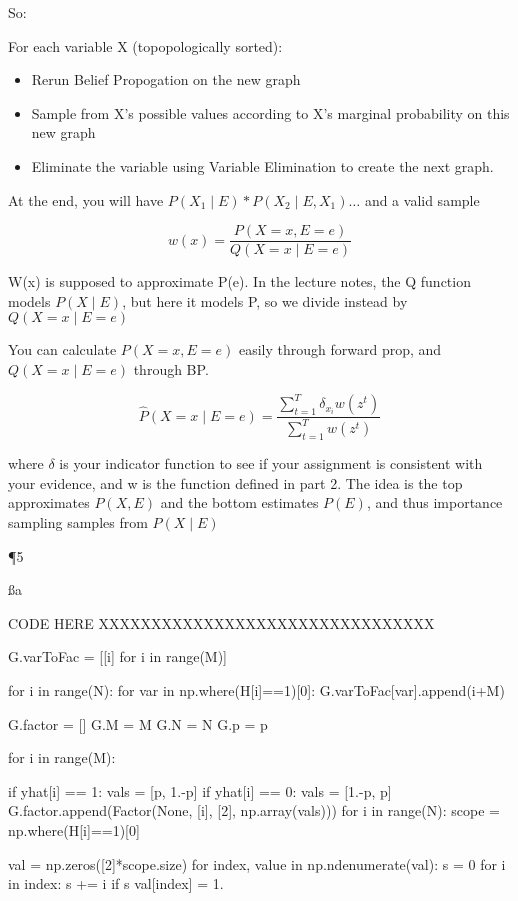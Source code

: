 So:

For each variable X (topopologically sorted):
\begin{itemize}
\item Rerun Belief Propogation on the new graph
\item Sample from X's possible values according to X's marginal probability on this new graph
\item Eliminate the variable using Variable Elimination to create the next graph.
\end{itemize}

At the end, you will have $P(X_1 \mid E) * P(X_2 \mid E, X_1) \dots$ and a valid sample

\[
	w(x) = \frac{P(X=x,E=e)}{Q(X=x \mid E=e)}
\]

W(x) is supposed to approximate P(e). In the lecture notes, the Q function models $P(X \mid E)$, but here it models P, so we divide instead by $Q(X=x \mid E=e)$

You can calculate $P(X=x,E=e)$ easily through forward prop, and $Q(X=x \mid E=e)$ through BP.

\[
\hat{P}(X=x \mid E=e) = \frac{\sum_{t=1}^T \delta_{x_i}w(z^t)}{\sum_{t=1}^T w(z^t)}
\]

where $\delta$ is your indicator function to see if your assignment is consistent with your evidence, and w is the function defined in part 2. The idea is the top approximates $P(X,E)$ and the bottom estimates $P(E)$, and thus importance sampling samples from $P(X \mid E)$

\P 5

\ss a

CODE HERE XXXXXXXXXXXXXXXXXXXXXXXXXXXXXXXX

    G.varToFac = [[i] for i in range(M)]

    for i in range(N):
        for var in np.where(H[i]==1)[0]:
            G.varToFac[var].append(i+M)

    G.factor = []
    G.M = M
    G.N = N
    G.p = p

    for i in range(M):

        if yhat[i] == 1:
            vals = [p, 1.-p]
        if yhat[i] == 0:
            vals = [1.-p, p]
        G.factor.append(Factor(None, [i], [2], np.array(vals)))
    for i in range(N):
        scope = np.where(H[i]==1)[0]

        val = np.zeros([2]*scope.size)
        for index, value in np.ndenumerate(val):
            s = 0
            for i in index:
                s += i
            if s%
                val[index] = 1.

